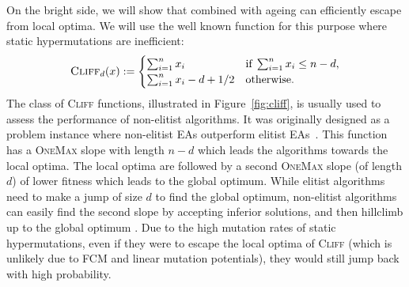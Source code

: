 \documentclass[lettersize,journal]{IEEEtran}
\begin{document}
 	On the bright side, we will show that {\expoHD } combined with ageing can efficiently escape from local optima. We will use the well known \cliff{} function %
 	for this purpose where static hypermutations are inefficient:
 	\begin{equation} \label{func:cliff}
 		\textsc{Cliff}_{d}(x):=\begin{cases}
 			\sum_{i=1}^n x_i & \text{if}\; \sum_{i=1}^n x_i \leq n-d, \\
 			\sum_{i=1}^n x_i -d+ 1/2 & \text{otherwise.}
 		\end{cases}
 	\end{equation}
 	The class of \textsc{Cliff} functions, illustrated in Figure~\ref{fig:cliff}, is usually used to assess the performance of non-elitist algorithms. %
 	It was originally designed as a problem instance where non-elitist EAs outperform elitist EAs~\cite{JaegerskuepperStorch}. This function  has a \textsc{OneMax} slope with length $n-d$ which leads the algorithms towards the local optima. The local optima are followed by a second \textsc{OneMax} slope (of length $d$) of lower fitness which leads to the global optimum. While elitist algorithms need to make a jump of size $d$ to find the global optimum, non-elitist algorithms can easily find the second slope by accepting inferior solutions, %
 	and then hillclimb up to the global optimum \cite{LissovoiOlivetoWarwicker2019AAAI,CorusOlivetoYazdani2019TCS,CorusOlivetoYazdani2021TEVC,HeviaSudholtAlgo24}. 
 	Due to the high mutation rates of static hypermutations, even if they were to escape the local optima of \textsc{Cliff} (which is unlikely due to FCM and linear mutation potentials), they would still jump back with high probability.  
 	
 	
 	
 	
\end{document}
